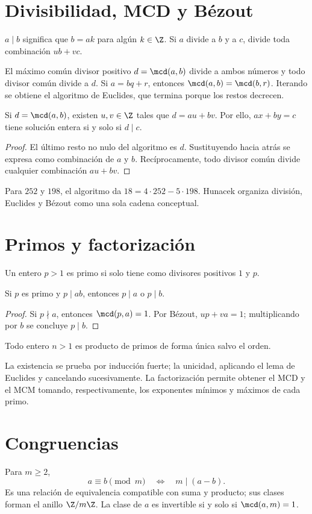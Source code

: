 \documentclass[10pt,a4paper]{article}
\begin{document}
\section{Divisibilidad, MCD y Bézout}
$a\mid b$ significa que $b=ak$ para algún $k\in\Z$. Si $a$ divide a $b$ y a $c$, divide toda combinación $ub+vc$.

El máximo común divisor positivo $d=\mcd(a,b)$ divide a ambos números y todo divisor común divide a $d$. Si $a=bq+r$, entonces $\mcd(a,b)=\mcd(b,r)$. Iterando se obtiene el algoritmo de Euclides, que termina porque los restos decrecen.

\begin{teorema}[Bézout]
Si $d=\mcd(a,b)$, existen $u,v\in\Z$ tales que $d=au+bv$. Por ello, $ax+by=c$ tiene solución entera si y solo si $d\mid c$.
\end{teorema}
\begin{proof}
El último resto no nulo del algoritmo es $d$. Sustituyendo hacia atrás se expresa como combinación de $a$ y $b$. Recíprocamente, todo divisor común divide cualquier combinación $au+bv$.
\end{proof}
Para $252$ y $198$, el algoritmo da $18=4\cdot252-5\cdot198$. Hunacek organiza división, Euclides y Bézout como una sola cadena conceptual.

\section{Primos y factorización}
Un entero $p>1$ es primo si solo tiene como divisores positivos $1$ y $p$.

\begin{lema}[Euclides]
Si $p$ es primo y $p\mid ab$, entonces $p\mid a$ o $p\mid b$.
\end{lema}
\begin{proof}
Si $p\nmid a$, entonces $\mcd(p,a)=1$. Por Bézout, $up+va=1$; multiplicando por $b$ se concluye $p\mid b$.
\end{proof}

\begin{teorema}
Todo entero $n>1$ es producto de primos de forma única salvo el orden.
\end{teorema}
La existencia se prueba por inducción fuerte; la unicidad, aplicando el lema de Euclides y cancelando sucesivamente. La factorización permite obtener el MCD y el MCM tomando, respectivamente, los exponentes mínimos y máximos de cada primo.

\section{Congruencias}
Para $m\ge2$,
\[
a\equiv b\pmod m\quad\Longleftrightarrow\quad m\mid(a-b).
\]
Es una relación de equivalencia compatible con suma y producto; sus clases forman el anillo $\Z/m\Z$. La clase de $a$ es invertible si y solo si $\mcd(a,m)=1$.
\end{document}
